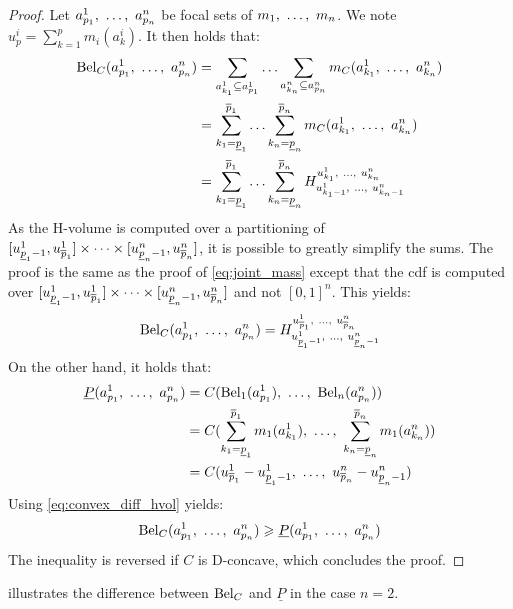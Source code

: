 \begin{proof}
    Let $a^1_{p_1} , ~\ldots, ~ a^n_{p_n}$ be focal sets of $m_1 , ~\ldots, ~ m_n$. We note $u^i_p=\sum_{k=1}^p m_i(a^i_k)$. It then holds that:
    \begin{align*}
        \mathrm{Bel}_C(a^1_{p_1} , ~\ldots, ~ a^n_{p_n}) &= \sum_{a^1_{k_1}\subseteq a^1_{p_1}}\ldots\sum_{a^n_{k_n}\subseteq a^n_{p_n}}m_C(a^1_{k_1} , ~\ldots, ~  a^n_{k_n})\\
        &= \sum_{k_1=\underline{p}_1}^{\overline{p}_1}\ldots\sum_{k_n=\underline{p}_n}^{\overline{p}_n}m_C(a^1_{k_1} , ~\ldots, ~  a^n_{k_n})\\
        &= \sum_{k_1=\underline{p}_1}^{\overline{p}_1}\ldots\sum_{k_n=\underline{p}_n}^{\overline{p}_n}H_{u^1_{k_1-1} , ~\ldots, ~ u^n_{k_n-1}}^{u^1_{k_1} , ~\ldots, ~ u^n_{k_n}}
    \end{align*}
    As the H-volume is computed over a partitioning of $[u^1_{\underline{p}_1-1}, u^1_{\overline{p}_1}]\times\dots\times[u^n_{\underline{p}_n-1} , u^n_{\overline{p}_n}]$, it is possible to greatly simplify the sums. The proof is the same as the proof of \eqref{eq:joint_mass} except that the \acrshort{cdf} is computed over $[u^1_{\underline{p}_1-1}, u^1_{\overline{p}_1}]\times\dots\times[u^n_{\underline{p}_n-1} , u^n_{\overline{p}_n}]$ and not $[0,1]^n$. This yields:
    \begin{align*}
        \mathrm{Bel}_C(a^1_{p_1} , ~\ldots, ~ a^n_{p_n}) = H_{u^1_{\underline{p}_1-1} , ~\ldots, ~ u^n_{\underline{p}_n-1}}^{u^1_{\overline{p}_1} , ~\ldots, ~ u^n_{\overline{p}_n}}
    \end{align*}
    On the other hand, it holds that:
    \begin{align*}
        \underline{P}(a^1_{p_1} , ~\ldots, ~ a^n_{p_n}) &= C(\mathrm{Bel}_1(a^1_{p_1}) , ~\ldots, ~ \mathrm{Bel}_n(a^n_{p_n}))\\
        &= C(\sum_{k_1=\underline{p}_1}^{\overline{p}_1} m_1(a^1_{k_1}) , ~\ldots, ~ \sum_{k_n=\underline{p}_n}^{\overline{p}_n} m_1(a^n_{k_n}))\\
        &= C(u^1_{\overline{p}_1} - u^1_{\underline{p}_1-1} , ~\ldots, ~ u^n_{\overline{p}_n} - u^n_{\underline{p}_n-1})
    \end{align*}
    Using \cref{eq:convex_diff_hvol} yields:
    \begin{align*}
        \mathrm{Bel}_C(a^1_{p_1} , ~\ldots, ~ a^n_{p_n}) \geqslant \underline{P}(a^1_{p_1} , ~\ldots, ~ a^n_{p_n})
    \end{align*}
    The inequality is reversed if $C$ is D-concave, which concludes the proof.
\end{proof}

 illustrates the difference between $\mathrm{Bel}_C$ and $\underline{P}$ in the case $n=2$.

